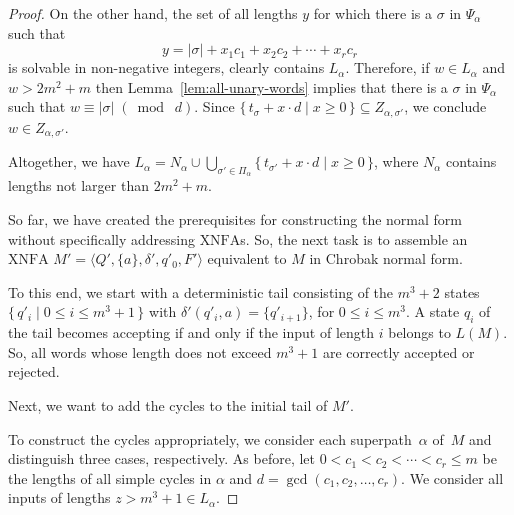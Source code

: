 \documentclass[final,copyright,noderivs]{eptcs}
\theoremstyle{plain}
\theoremstyle{definition}
\newcommand{\xnfa}{\textrm{XNFA}}
\begin{document}
\begin{proof}
On the other hand, the set of all lengths $y$ for which there is a
$\sigma$ in $\Psi_\alpha$ such that
$$
y= |\sigma| + x_1 c_1 + x_2 c_2 + \cdots + x_r c_r
$$ 
is solvable 
in non-negative integers, clearly contains $L_\alpha$.
Therefore, if \mbox{$w\in L_\alpha$} and $w > 2m^2+m$ then
Lemma~\ref{lem:all-unary-words} implies that
there is a
$\sigma$ in $\Psi_\alpha$ such that
$w \equiv |\sigma|\; (\bmod\; d)$.
Since 
$\{\, t_{\sigma} + x\cdot d\mid x\geq 0\,\}\subseteq Z_{\alpha,\sigma'}$,
we conclude $w\in Z_{\alpha,\sigma'}$.

Altogether, we have $L_\alpha = N_\alpha \cup 
\bigcup_{\sigma'\in \Pi_\alpha} \{\, t_{\sigma'} + x\cdot d\mid x\geq 0\,\}$,
where $N_\alpha$ contains lengths not larger than $2m^2+m$.

So far, we have created the prerequisites for constructing the 
normal form without specifically addressing $\xnfa$s. So, the next task
is to assemble an $\xnfa$ $M'=\langle Q',\{a\},\delta',q'_0,F'\rangle$
equivalent to $M$ in Chrobak normal form.

To this end, we start with a deterministic tail consisting of the $m^3+2$ states
$\{\, q'_i \mid 0\leq i\leq m^3+1\,\}$ with
$\delta'(q'_i,a)=\{q'_{i+1}\}$, for $0\leq i\leq m^3$.
A state $q_i$ of the tail becomes accepting if and only if
the input of length $i$ belongs to $L(M)$. So, all words whose length 
does not exceed $m^3+1$ are correctly accepted or rejected.

Next, we want to add the cycles to the initial tail of $M'$.

To construct the cycles appropriately, we consider each superpath~$\alpha$ 
of~$M$ and distinguish three cases, respectively. As before, let 
\mbox{$0< c_1 < c_2 <\cdots < c_r\leq m$} be the lengths of all 
simple cycles in $\alpha$ and \mbox{$d= \gcd(c_1,c_2,\dots, c_r)$.}
We consider all inputs of lengths \mbox{$z > m^3+1 \in L_\alpha$.}


\end{proof}
\end{document}
